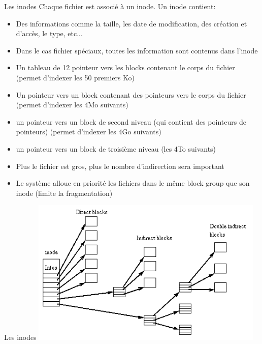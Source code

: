 \begin{frame}[fragile=singleslide]{Les inodes}
  Chaque fichier est associé à un inode. Un inode contient:
  \begin{itemize}
  \item Des informations comme  la taille, les date de modification,
    des création et d'accès, le type, etc...
  \item Dans  le cas fichier  spéciaux, toutes les  information sont
    contenus dans l'inode
  \item Un tableau de 12 pointeur vers les blocks contenant le corps
    du fichier (permet d'indexer les 50 premiers Ko)
  \item Un  pointeur vers un  block contenant des pointeurs  vers le
    corps du fichier (permet d'indexer les 4Mo suivants)
  \item un pointeur vers un block de second niveau (qui contient des
    pointeurs de pointeurs) (permet d'indexer les 4Go suivants)
  \item  un  pointeur vers  un  block  de  troisième niveau  (les 4To suivants)
  \item Plus le fichier est  gros, plus le nombre d'indirection sera
    important
  \item  Le système  alloue en  priorité les  fichiers dans  le même
    block group que son inode (limite la fragmentation)
  \end{itemize}
\end{frame}

\begin{frame}[fragile=singleslide]{Les inodes}
  \includegraphics[height=7cm]{pics/Ext2-inode}
\end{frame}

